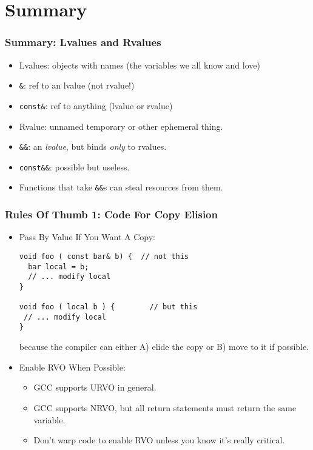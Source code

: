 \section[Summary]{Summary}

\begin{frame}[fragile]
\frametitle {Summary: Lvalues and Rvalues}
\begin{itemize}[<+->]
\item Lvalues: objects with names (the variables we all know and love)
\item \texttt{\&}: ref to an lvalue (not rvalue!)
\item \texttt{const\&}: ref to anything (lvalue or rvalue)
\item Rvalue: unnamed temporary or other ephemeral thing. 
\item \texttt{\&\&}: an \emph{lvalue}, but binds \emph{only} to rvalues.
\item \texttt{const\&\&}: possible but useless.
\vskip 6pt
\item Functions that take \texttt{\&\&}s can steal resources from them.
\end{itemize}
\end{frame}


\begin{frame}[fragile]
\frametitle {Rules Of Thumb 1: Code For Copy Elision}
\begin{itemize}[<+->]
\item Pass By Value If You Want A Copy:
{\scriptsize
\begin{verbatim}
void foo ( const bar& b) {  // not this
  bar local = b;
  // ... modify local
}

void foo ( local b ) {        // but this
 // ... modify local 
}

\end{verbatim}
}
because the compiler can either A) elide the copy or B) move to it if
possible.

\vskip 12pt
\item Enable RVO When Possible:
  \begin{itemize}
    \item GCC supports URVO in general.
    \item GCC supports NRVO, but all return statements must return the
      same variable.
    \item Don't warp code to enable RVO unless you know it's really
      critical.
   \end{itemize}

\end{itemize}
\end{frame}

